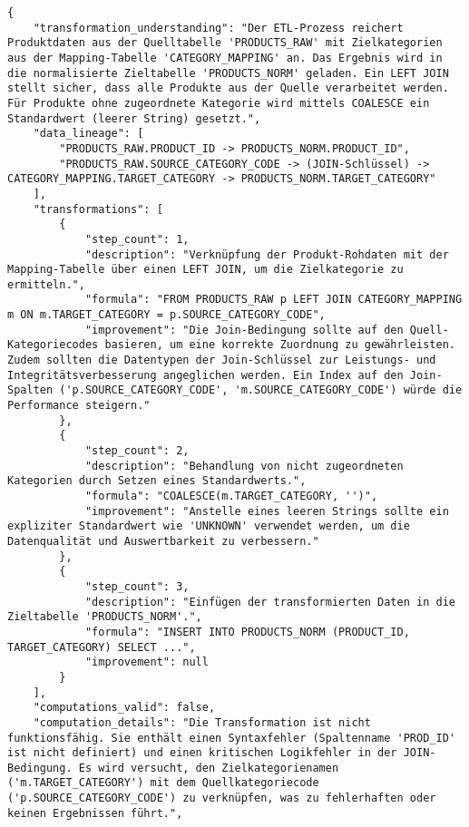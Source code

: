 \begin{lstlisting}[caption={Ausgabe: GEMINI 2.5 Pro Anwendungsfall 6 Robustheitsdurchlauf},label={gemini_case6_prompt3}]
{
    "transformation_understanding": "Der ETL-Prozess reichert Produktdaten aus der Quelltabelle 'PRODUCTS_RAW' mit Zielkategorien aus der Mapping-Tabelle 'CATEGORY_MAPPING' an. Das Ergebnis wird in die normalisierte Zieltabelle 'PRODUCTS_NORM' geladen. Ein LEFT JOIN stellt sicher, dass alle Produkte aus der Quelle verarbeitet werden. Für Produkte ohne zugeordnete Kategorie wird mittels COALESCE ein Standardwert (leerer String) gesetzt.",
    "data_lineage": [
        "PRODUCTS_RAW.PRODUCT_ID -> PRODUCTS_NORM.PRODUCT_ID",
        "PRODUCTS_RAW.SOURCE_CATEGORY_CODE -> (JOIN-Schlüssel) -> CATEGORY_MAPPING.TARGET_CATEGORY -> PRODUCTS_NORM.TARGET_CATEGORY"
    ],
    "transformations": [
        {
            "step_count": 1,
            "description": "Verknüpfung der Produkt-Rohdaten mit der Mapping-Tabelle über einen LEFT JOIN, um die Zielkategorie zu ermitteln.",
            "formula": "FROM PRODUCTS_RAW p LEFT JOIN CATEGORY_MAPPING m ON m.TARGET_CATEGORY = p.SOURCE_CATEGORY_CODE",
            "improvement": "Die Join-Bedingung sollte auf den Quell-Kategoriecodes basieren, um eine korrekte Zuordnung zu gewährleisten. Zudem sollten die Datentypen der Join-Schlüssel zur Leistungs- und Integritätsverbesserung angeglichen werden. Ein Index auf den Join-Spalten ('p.SOURCE_CATEGORY_CODE', 'm.SOURCE_CATEGORY_CODE') würde die Performance steigern."
        },
        {
            "step_count": 2,
            "description": "Behandlung von nicht zugeordneten Kategorien durch Setzen eines Standardwerts.",
            "formula": "COALESCE(m.TARGET_CATEGORY, '')",
            "improvement": "Anstelle eines leeren Strings sollte ein expliziter Standardwert wie 'UNKNOWN' verwendet werden, um die Datenqualität und Auswertbarkeit zu verbessern."
        },
        {
            "step_count": 3,
            "description": "Einfügen der transformierten Daten in die Zieltabelle 'PRODUCTS_NORM'.",
            "formula": "INSERT INTO PRODUCTS_NORM (PRODUCT_ID, TARGET_CATEGORY) SELECT ...",
            "improvement": null
        }
    ],
    "computations_valid": false,
    "computation_details": "Die Transformation ist nicht funktionsfähig. Sie enthält einen Syntaxfehler (Spaltenname 'PROD_ID' ist nicht definiert) und einen kritischen Logikfehler in der JOIN-Bedingung. Es wird versucht, den Zielkategorienamen ('m.TARGET_CATEGORY') mit dem Quellkategoriecode ('p.SOURCE_CATEGORY_CODE') zu verknüpfen, was zu fehlerhaften oder keinen Ergebnissen führt.",

\end{lstlisting}
